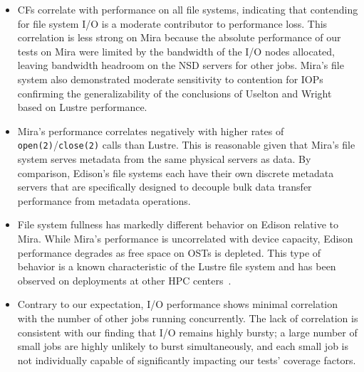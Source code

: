 \begin{itemize}[leftmargin=*]

\item CFs correlate with performance on all file systems, indicating that contending for file system I/O is a moderate contributor to performance loss.
This correlation is less strong on Mira because the absolute performance of our tests on Mira were limited by the bandwidth of the I/O nodes allocated, leaving bandwidth headroom on the NSD servers for other jobs.
Mira's file system also demonstrated moderate sensitivity to contention for
IOPs confirming the generalizability of the conclusions of Uselton and Wright~\cite{Uselton2013} based on Lustre performance.

\item Mira's performance correlates negatively with higher rates of \texttt{open(2)}/\texttt{close(2)} calls than Lustre.
This is reasonable given that Mira's file system serves metadata from the same physical servers as data.
By comparison, Edison's file systems each have their own discrete metadata servers that are specifically designed to decouple bulk data transfer performance from metadata operations.

\item File system fullness has markedly different behavior on Edison relative to Mira.
While Mira's performance is uncorrelated with device capacity, Edison performance degrades as free space on OSTs is depleted.
This type of behavior is a known characteristic of the Lustre file system and has been observed on deployments at other HPC centers~\cite{oral2014best}.

\item Contrary to our expectation, I/O performance shows minimal correlation with the number of other jobs running concurrently.
The lack of correlation is consistent with our finding that I/O remains highly bursty; a large number of small jobs are highly unlikely to burst simultaneously, and each small job is not individually capable of significantly impacting our tests' coverage factors.


\end{itemize}

